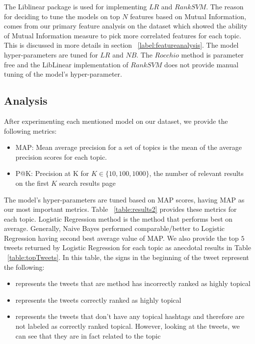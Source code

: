 The Liblinear \cite{liblinear} package is used for implementing $LR$ and $RankSVM$. The reason for deciding to tune the models on top $N$ features based on Mutual Information, comes from our primary feature analysis on the dataset which showed the ability of Mutual Information measure to pick more correlated features for each topic. This is discussed in more details in section ~\ref{label:featureanalysis}. The model hyper-parameters are tuned for $LR$ and $NB$. The $Rocchio$ method is parameter free and the LibLinear \cite{liblinear} implementation of $RankSVM$ does not provide manual tuning of the model's hyper-parameter.

\subsection{Analysis}
After experimenting each mentioned model on our dataset, we provide the following metrics:

\begin{itemize}
\item MAP: Mean average precision for a set of topics is the mean of the average precision scores for each topic.
\item P@K: Precision at K for $K \in \{ 10, 100, 1000 \}$, the number of relevant results on the first $K$ search results page
\end{itemize}

The model's hyper-parameters are tuned based on MAP scores, having MAP as our most important metrics. Table ~\ref{table:results2} provides these metrics for each topic. Logistic Regression method is the method that performs best on average. Generally, Naive Bayes performed comparable/better to Logistic Regression having second best average value of MAP. We also provide the top $5$ tweets returned by Logistic Regression for each topic as anecdotal results in Table ~\ref{table:topTweets}. In this table, the signs in the beginning of the tweet represent the following:
\begin{itemize}
\item \xmark represents the tweets that are method has incorrectly ranked as highly topical
\item \checkmark represents the tweets correctly ranked as highly topical
\item \starmark represents the tweets that don't have any topical hashtags and therefore are not labeled as correctly ranked topical. However, looking at the tweets, we can see that they are in fact related to the topic
\end{itemize}  

